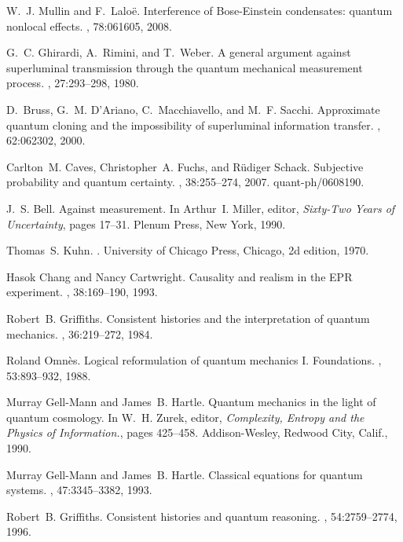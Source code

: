 \documentclass[12pt]{article} %
\begin{document}
\begin{thebibliography}{10}
W.~J. Mullin and F.~Lalo{\"e}.
\newblock Interference of {B}ose-{E}instein condensates: quantum nonlocal
  effects.
, 78:061605, 2008.

G.~C. Ghirardi, A.~Rimini, and T.~Weber.
\newblock A general argument against superluminal transmission through the
  quantum mechanical measurement process.
, 27:293--298, 1980.

D.~Bruss, G.~M. D'Ariano, C.~Macchiavello, and M.~F. Sacchi.
\newblock Approximate quantum cloning and the impossibility of superluminal
  information transfer.
, 62:062302, 2000.

Carlton~M. Caves, Christopher~A. Fuchs, and R{\"u}diger Schack.
\newblock Subjective probability and quantum certainty.
, 38:255--274, 2007.
\newblock quant-ph/0608190.

J.~S. Bell.
\newblock Against measurement.
\newblock In Arthur~I. Miller, editor, {\em Sixty-Two Years of Uncertainty},
  pages 17--31. Plenum Press, New York, 1990.

Thomas~S. Kuhn.
.
\newblock University of Chicago Press, Chicago, 2d edition, 1970.

Hasok Chang and Nancy Cartwright.
\newblock Causality and realism in the {E}{P}{R} experiment.
, 38:169--190, 1993.

Robert~B. Griffiths.
\newblock Consistent histories and the interpretation of quantum mechanics.
, 36:219--272, 1984.

Roland Omn\`es.
\newblock Logical reformulation of quantum mechanics {I}. {F}oundations.
, 53:893--932, 1988.

Murray Gell-Mann and James~B. Hartle.
\newblock Quantum mechanics in the light of quantum cosmology.
\newblock In W.~H. Zurek, editor, {\em Complexity, Entropy and the Physics of
  Information.}, pages 425--458. Addison-Wesley, Redwood City, Calif., 1990.

Murray Gell-Mann and James~B. Hartle.
\newblock Classical equations for quantum systems.
, 47:3345--3382, 1993.

Robert~B. Griffiths.
\newblock Consistent histories and quantum reasoning.
, 54:2759--2774, 1996.


\end{thebibliography}
\end{document}
